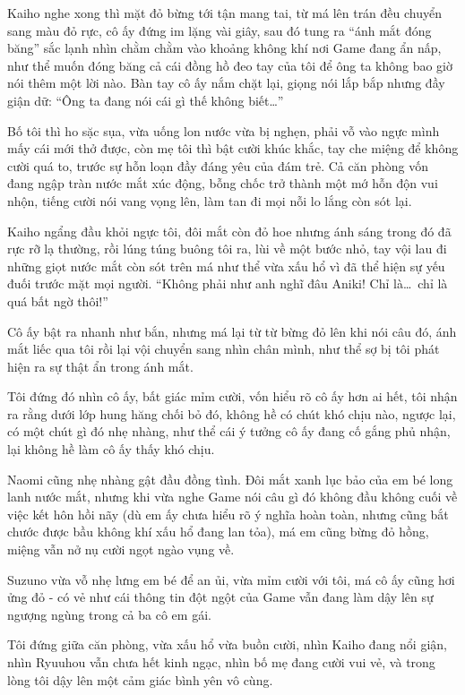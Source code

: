﻿\documentclass[../main.tex]{subfiles}
\begin{document}
Kaiho nghe xong thì mặt đỏ bừng tới tận mang tai, từ má lên trán đều chuyển sang màu đỏ rực, cô ấy đứng im lặng vài giây, sau đó tung ra ``ánh mắt đóng băng'' sắc lạnh nhìn chằm chằm vào khoảng không khí nơi Game đang ẩn nấp, như thể muốn đóng băng cả cái đồng hồ đeo tay của tôi để ông ta không bao giờ nói thêm một lời nào. Bàn tay cô ấy nắm chặt lại, giọng nói lắp bắp nhưng đầy giận dữ: ``Ông ta đang nói cái gì thế không biết\dots''

Bố tôi thì ho sặc sụa, vừa uống lon nước vừa bị nghẹn, phải vỗ vào ngực mình mấy cái mới thở được, còn mẹ tôi thì bật cười khúc khắc, tay che miệng để không cười quá to, trước sự hỗn loạn đầy đáng yêu của đám trẻ. Cả căn phòng vốn đang ngập tràn nước mắt xúc động, bỗng chốc trở thành một mớ hỗn độn vui nhộn, tiếng cười nói vang vọng lên, làm tan đi mọi nỗi lo lắng còn sót lại.

Kaiho ngẩng đầu khỏi ngực tôi, đôi mắt còn đỏ hoe nhưng ánh sáng trong đó đã rực rỡ lạ thường, rồi lúng túng buông tôi ra, lùi về một bước nhỏ, tay vội lau đi những giọt nước mắt còn sót trên má như thể vừa xấu hổ vì đã thể hiện sự yếu đuối trước mặt mọi người. ``Không phải như anh nghĩ đâu Aniki! Chỉ là\dots\ chỉ là quá bất ngờ thôi!''

Cô ấy bật ra nhanh như bắn, nhưng má lại từ từ bừng đỏ lên khi nói câu đó, ánh mắt liếc qua tôi rồi lại vội chuyển sang nhìn chân mình, như thể sợ bị tôi phát hiện ra sự thật ẩn trong ánh mắt.

Tôi đứng đó nhìn cô ấy, bất giác mỉm cười, vốn hiểu rõ cô ấy hơn ai hết, tôi nhận ra rằng dưới lớp hung hăng chối bỏ đó, không hề có chút khó chịu nào, ngược lại, có một chút gì đó nhẹ nhàng, như thể cái ý tưởng cô ấy đang cố gắng phủ nhận, lại không hề làm cô ấy thấy khó chịu.

Naomi cũng nhẹ nhàng gật đầu đồng tình. Đôi mắt xanh lục bảo của em bé long lanh nước mắt, nhưng khi vừa nghe Game nói câu gì đó không đầu không cuối về việc kết hôn hồi nãy (dù em ấy chưa hiểu rõ ý nghĩa hoàn toàn, nhưng cũng bắt chước được bầu không khí xấu hổ đang lan tỏa), má em cũng bừng đỏ hồng, miệng vẫn nở nụ cười ngọt ngào vụng về.

Suzuno vừa vỗ nhẹ lưng em bé để an ủi, vừa mỉm cười với tôi, má cô ấy cũng hơi ửng đỏ - có vẻ như cái thông tin đột ngột của Game vẫn đang làm dậy lên sự ngượng ngùng trong cả ba cô em gái.

Tôi đứng giữa căn phòng, vừa xấu hổ vừa buồn cười, nhìn Kaiho đang nổi giận, nhìn Ryuuhou vẫn chưa hết kinh ngạc, nhìn bố mẹ đang cười vui vẻ, và trong lòng tôi dậy lên một cảm giác bình yên vô cùng.
\end{document}
